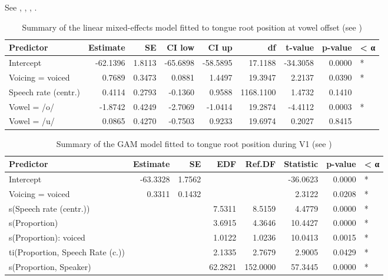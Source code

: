 \documentclass[
  12pt,
]{article}
\begin{document}
See , ,
, .

\begin{table}[t]

\caption{\label{tab:tra-lm-table}Summary of the linear mixed-effects model fitted to tongue root position at vowel offset (see )}
\centering
\fontsize{10}{12}\selectfont
\begin{tabular}{lrrrrrrrl}
\toprule
Predictor & Estimate & SE & CI low & CI up & df & t-value & p-value & < α\\
\midrule
Intercept & -62.1396 & 1.8113 & -65.6898 & -58.5895 & 17.1188 & -34.3058 & 0.0000 & *\\
Voicing = voiced & 0.7689 & 0.3473 & 0.0881 & 1.4497 & 19.3947 & 2.2137 & 0.0390 & *\\
Speech rate (centr.) & 0.4114 & 0.2793 & -0.1360 & 0.9588 & 1168.1100 & 1.4732 & 0.1410 & \\
Vowel = /o/ & -1.8742 & 0.4249 & -2.7069 & -1.0414 & 19.2874 & -4.4112 & 0.0003 & *\\
Vowel = /u/ & 0.0865 & 0.4270 & -0.7503 & 0.9233 & 19.6974 & 0.2027 & 0.8415 & \\
\bottomrule
\end{tabular}
\end{table}

\begin{table}[t]

\caption{\label{tab:tra-gam-ar-table}Summary of the GAM model fitted to tongue root position during V1 (see )}
\centering
\fontsize{10}{12}\selectfont
\begin{tabular}{lrrrrrrl}
\toprule
Predictor & Estimate & SE & EDF & Ref.DF & Statistic & p-value & < α\\
\midrule
Intercept & -63.3328 & 1.7562 &  &  & -36.0623 & 0.0000 & *\\
Voicing = voiced & 0.3311 & 0.1432 &  &  & 2.3122 & 0.0208 & *\\
s(Speech rate (centr.)) &  &  & 7.5311 & 8.5159 & 4.4779 & 0.0000 & *\\
s(Proportion) &  &  & 3.6915 & 4.3646 & 10.4427 & 0.0000 & *\\
s(Proportion): voiced &  &  & 1.0122 & 1.0236 & 10.0413 & 0.0015 & *\\
ti(Proportion, Speech Rate (c.)) &  &  & 2.1335 & 2.7679 & 2.9005 & 0.0429 & *\\
s(Proportion, Speaker) &  &  & 62.2821 & 152.0000 & 57.3445 & 0.0000 & *\\
\bottomrule
\end{tabular}
\end{table}
\end{document}
